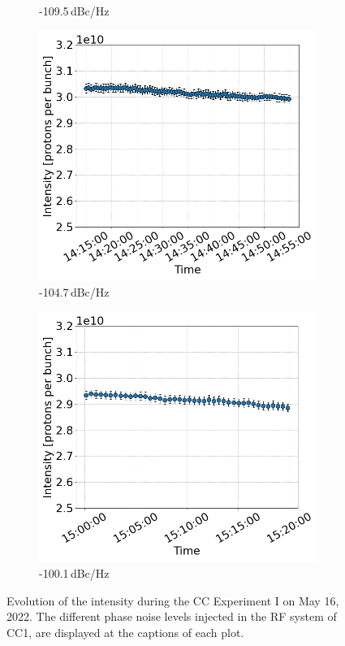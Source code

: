 \begin{figure}[htp]
\begin{subfigure}{.45\textwidth}
        \caption{-109.5\,dBc/Hz}
    \end{subfigure}
    \begin{subfigure}{.45\textwidth}
        \centering
        \includegraphics[width=.95\linewidth]{images/app_e/intensity_cc_md_16May22_coast_4.png}  
        \caption{-104.7\,dBc/Hz}
    \end{subfigure}
    \begin{subfigure}{.45\textwidth}
            \centering
            \includegraphics[width=.95\linewidth]{images/app_e/intensity_cc_md_16May22_coast_5.png}  
            \caption{-100.1\,dBc/Hz}
    \end{subfigure}
    \caption{Evolution of the intensity during the CC Experiment I on May 16, 2022. The different phase noise levels injected in the RF system of CC1, are displayed at the captions of each plot.}
    \label{fig:cc_md_16_may_2022_intensity_overview_exper1}
 \end{figure}
 

